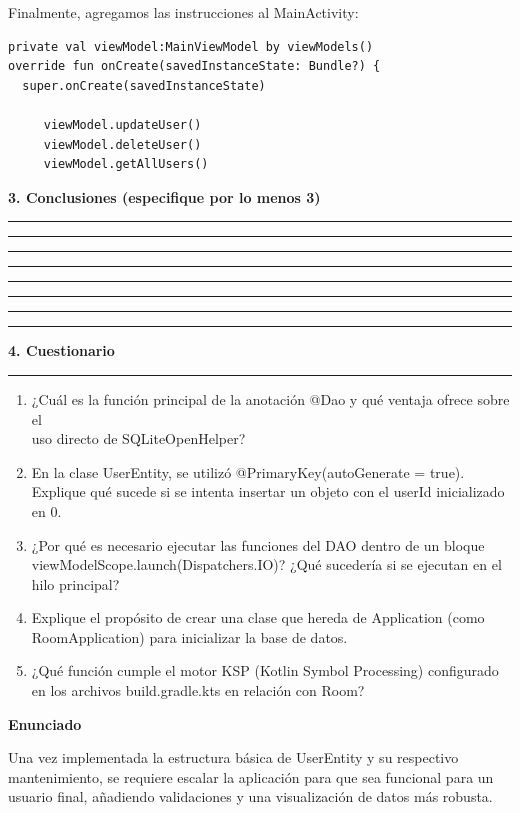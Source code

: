 \documentclass[10pt,letterpaper]{article}
\newcommand{\ruledheading}[1]{\par\vspace{0.2em}
\noindent\textbf{#1}\par
\noindent\rule{\linewidth}{0.45pt}\par}
\newcommand{\blankline}{
\noindent\rule{\linewidth}{0.35pt}\par\vspace{0.30in}}
\begin{document}
Finalmente, agregamos las instrucciones al MainActivity:

\begin{lstlisting}
private val viewModel:MainViewModel by viewModels()
override fun onCreate(savedInstanceState: Bundle?) {
  super.onCreate(savedInstanceState)

     viewModel.updateUser()
     viewModel.deleteUser()
     viewModel.getAllUsers()
\end{lstlisting}

\ruledheading{3. Conclusiones (especifique por lo menos 3)}
\blankline\blankline\blankline\blankline\blankline\blankline\blankline
\ruledheading{4. Cuestionario}

\begin{enumerate}
  \item ¿Cuál es la función principal de la anotación @Dao y qué ventaja ofrece sobre el\\uso directo de \mbox{SQLiteOpenHelper}?
  \item En la clase UserEntity, se utilizó @PrimaryKey(autoGenerate = true). Explique qué sucede si se intenta insertar un objeto con el userId inicializado en 0.
  \item ¿Por qué es necesario ejecutar las funciones del DAO dentro de un bloque\\viewModelScope.launch(Dispatchers.IO)? ¿Qué sucedería si se ejecutan en el hilo principal?
  \item Explique el propósito de crear una clase que hereda de Application (como RoomApplication) para inicializar la base de datos.
  \item ¿Qué función cumple el motor KSP (Kotlin Symbol Processing) configurado en los archivos build.gradle.kts en relación con Room?
\end{enumerate}

\textbf{Enunciado}

Una vez implementada la estructura básica de UserEntity y su respectivo mantenimiento, se requiere escalar la aplicación para que sea funcional para un usuario final, añadiendo validaciones y una visualización de datos más robusta.

\end{document}

